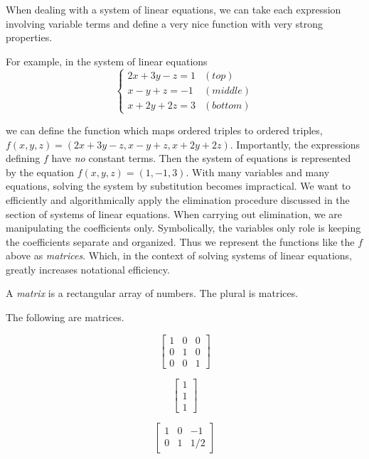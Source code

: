 When dealing with a system of linear equations, we can take each expression involving variable terms and define a very nice function with very strong properties.

For example, in the system of linear equations
\[\begin{cases}
    2x + 3y -z = 1 & (top) \\
    x - y +z = -1 & (middle) \\
    x+2y+2z = 3 & (bottom)
\end{cases}\]

we can define the function which maps ordered triples to ordered triples, \(f(x,y,z) = ( 2x+3y-z , x-y+z , x+2y+2z ).\) Importantly, the expressions defining \(f\) have \emph{no} constant terms. Then the system of equations is represented by the equation \(f(x,y,z) = (1,-1,3).\) With many variables and many equations, solving the system by substitution becomes impractical. We want to efficiently and algorithmically apply the elimination procedure discussed in the section of systems of linear equations. When carrying out elimination, we are manipulating the coefficients only. Symbolically, the variables only role is keeping the coefficients separate and organized. Thus we represent the functions like the \(f\) above as \emph{matrices}. Which, in the context of solving systems of linear equations, greatly increases notational efficiency.

\begin{definition}
    A \emph{matrix} is a rectangular array of numbers. The plural is matrices.
\end{definition}

\begin{example}
    The following are matrices.

    \[\begin{bmatrix}
        1 & 0 & 0 \\
        0 & 1 & 0 \\
        0 & 0 & 1
    \end{bmatrix}\]

    \[\begin{bmatrix}
         1 \\
        1 \\
        1
    \end{bmatrix}\]

    \[\begin{bmatrix}
        1 & 0 & -1 \\
        0 & 1 & 1/2
    \end{bmatrix}\]
\end{example}

